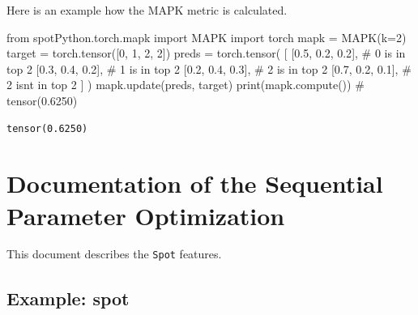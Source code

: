 \documentclass[
  letterpaper,
  DIV=11,
  numbers=noendperiod]{scrreprt}
\newenvironment{Shaded}{\begin{snugshade}}{\end{snugshade}}
\newcommand{\BuiltInTok}[1]{\textcolor[rgb]{0.00,0.23,0.31}{#1}}
\newcommand{\CommentTok}[1]{\textcolor[rgb]{0.37,0.37,0.37}{#1}}
\newcommand{\DecValTok}[1]{\textcolor[rgb]{0.68,0.00,0.00}{#1}}
\newcommand{\FloatTok}[1]{\textcolor[rgb]{0.68,0.00,0.00}{#1}}
\newcommand{\ImportTok}[1]{\textcolor[rgb]{0.00,0.46,0.62}{#1}}
\newcommand{\NormalTok}[1]{\textcolor[rgb]{0.00,0.23,0.31}{#1}}
\newcommand{\OperatorTok}[1]{\textcolor[rgb]{0.37,0.37,0.37}{#1}}
\begin{document}
Here is an example how the MAPK metric is calculated.

\begin{Shaded}
\begin{Highlighting}[]
\ImportTok{from}\NormalTok{ spotPython.torch.mapk }\ImportTok{import}\NormalTok{ MAPK}
\ImportTok{import}\NormalTok{ torch}
\NormalTok{mapk }\OperatorTok{=}\NormalTok{ MAPK(k}\OperatorTok{=}\DecValTok{2}\NormalTok{)}
\NormalTok{target }\OperatorTok{=}\NormalTok{ torch.tensor([}\DecValTok{0}\NormalTok{, }\DecValTok{1}\NormalTok{, }\DecValTok{2}\NormalTok{, }\DecValTok{2}\NormalTok{])}
\NormalTok{preds }\OperatorTok{=}\NormalTok{ torch.tensor(}
\NormalTok{    [}
\NormalTok{        [}\FloatTok{0.5}\NormalTok{, }\FloatTok{0.2}\NormalTok{, }\FloatTok{0.2}\NormalTok{],  }\CommentTok{\# 0 is in top 2}
\NormalTok{        [}\FloatTok{0.3}\NormalTok{, }\FloatTok{0.4}\NormalTok{, }\FloatTok{0.2}\NormalTok{],  }\CommentTok{\# 1 is in top 2}
\NormalTok{        [}\FloatTok{0.2}\NormalTok{, }\FloatTok{0.4}\NormalTok{, }\FloatTok{0.3}\NormalTok{],  }\CommentTok{\# 2 is in top 2}
\NormalTok{        [}\FloatTok{0.7}\NormalTok{, }\FloatTok{0.2}\NormalTok{, }\FloatTok{0.1}\NormalTok{],  }\CommentTok{\# 2 isn\textquotesingle{}t in top 2}
\NormalTok{    ]}
\NormalTok{)}
\NormalTok{mapk.update(preds, target)}
\BuiltInTok{print}\NormalTok{(mapk.compute()) }\CommentTok{\# tensor(0.6250)}
\end{Highlighting}
\end{Shaded}

\begin{verbatim}
tensor(0.6250)
\end{verbatim}

\cleardoublepage
{}
{}
\appendix

\hypertarget{documentation-of-the-sequential-parameter-optimization}{%
\chapter{Documentation of the Sequential Parameter
Optimization}\label{documentation-of-the-sequential-parameter-optimization}}

This document describes the \texttt{Spot} features.

\hypertarget{example-spot}{%
\section{Example: spot}\label{example-spot}}
\end{document}
